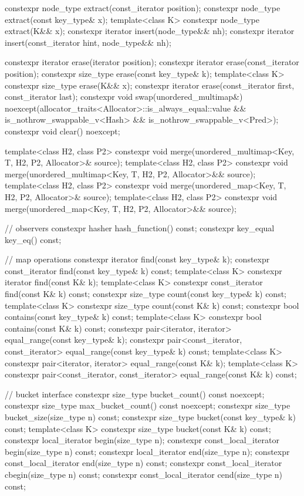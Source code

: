 \begin{codeblock}
{{    constexpr node_type extract(const_iterator position);
    constexpr node_type extract(const key_type& x);
    template<class K> constexpr node_type extract(K&& x);
    constexpr iterator insert(node_type&& nh);
    constexpr iterator insert(const_iterator hint, node_type&& nh);

    constexpr iterator  erase(iterator position);
    constexpr iterator  erase(const_iterator position);
    constexpr size_type erase(const key_type& k);
    template<class K> constexpr size_type erase(K&& x);
    constexpr iterator  erase(const_iterator first, const_iterator last);
    constexpr void      swap(unordered_multimap&)
      noexcept(allocator_traits<Allocator>::is_always_equal::value &&
               is_nothrow_swappable_v<Hash> && is_nothrow_swappable_v<Pred>);
    constexpr void      clear() noexcept;

    template<class H2, class P2>
      constexpr void merge(unordered_multimap<Key, T, H2, P2, Allocator>& source);
    template<class H2, class P2>
      constexpr void merge(unordered_multimap<Key, T, H2, P2, Allocator>&& source);
    template<class H2, class P2>
      constexpr void merge(unordered_map<Key, T, H2, P2, Allocator>& source);
    template<class H2, class P2>
      constexpr void merge(unordered_map<Key, T, H2, P2, Allocator>&& source);

    // observers
    constexpr hasher hash_function() const;
    constexpr key_equal key_eq() const;

    // map operations
    constexpr iterator         find(const key_type& k);
    constexpr const_iterator   find(const key_type& k) const;
    template<class K>
      constexpr iterator       find(const K& k);
    template<class K>
      constexpr const_iterator find(const K& k) const;
    constexpr size_type        count(const key_type& k) const;
    template<class K>
      constexpr size_type      count(const K& k) const;
    constexpr bool             contains(const key_type& k) const;
    template<class K>
      constexpr bool           contains(const K& k) const;
    constexpr pair<iterator, iterator>               equal_range(const key_type& k);
    constexpr pair<const_iterator, const_iterator>   equal_range(const key_type& k) const;
    template<class K>
      constexpr pair<iterator, iterator>             equal_range(const K& k);
    template<class K>
      constexpr pair<const_iterator, const_iterator> equal_range(const K& k) const;

    // bucket interface
    constexpr size_type bucket_count() const noexcept;
    constexpr size_type max_bucket_count() const noexcept;
    constexpr size_type bucket_size(size_type n) const;
    constexpr size_type bucket(const key_type& k) const;
    template<class K> constexpr size_type bucket(const K& k) const;
    constexpr local_iterator begin(size_type n);
    constexpr const_local_iterator begin(size_type n) const;
    constexpr local_iterator end(size_type n);
    constexpr const_local_iterator end(size_type n) const;
    constexpr const_local_iterator cbegin(size_type n) const;
    constexpr const_local_iterator cend(size_type n) const;

}}
\end{codeblock}
